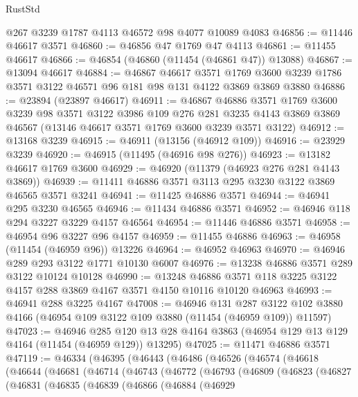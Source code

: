 \begin{lexlean}{RustStd}
\begin{coremodule}
    @267
    @3239
    @1787
    @4113
    @46572
    @98
    @4077
    @10089
    @4083
@46856 := @11446 @46617 @3571
@46860 := @46856 @47 @1769 @47 @4113
@46861 := @11455 @46617
@46866 := @46854 (@46860 (@11454 (@46861 @47)) @13088)
@46867 := @13094 @46617
@46884 := @46867
    @46617
    @3571
    @1769
    @3600
    @3239
    @1786
    @3571
    @3122
    @46571
    @96
    @181
    @98
    @131
    @4122
    @3869
    @3869
    @3880
@46886 := @23894 (@23897 @46617)
@46911 := @46867
    @46886
    @3571
    @1769
    @3600
    @3239
    @98
    @3571
    @3122
    @3986
    @109
    @276
    @281
    @3235
    @4143
    @3869
    @3869
    @46567
    (@13146 @46617 @3571 @1769 @3600 @3239 @3571 @3122)
@46912 := @13168 @3239
@46915 := @46911 (@13156 (@46912 @109))
@46916 := @23929 @3239
@46920 := @46915 (@11495 (@46916 @98 @276))
@46923 := @13182 @46617 @1769 @3600
@46929 := @46920 (@11379 (@46923 @276 @281 @4143 @3869))
@46939 := @11411 @46886 @3571 @3113 @295 @3230 @3122 @3869 @46565 @3571 @3241
@46941 := @11425 @46886 @3571
@46944 := @46941 @295 @3230 @46565
@46946 := @11434 @46886 @3571
@46952 := @46946 @118 @294 @3227 @3229 @4157 @46564
@46954 := @11446 @46886 @3571
@46958 := @46954 @96 @3227 @96 @4157
@46959 := @11455 @46886
@46963 := @46958 (@11454 (@46959 @96)) @13226
@46964 := @46952 @46963
@46970 := @46946 @289 @293 @3122 @1771 @10130 @6007
@46976 := @13238 @46886 @3571 @289 @3122 @10124 @10128
@46990 := @13248
    @46886
    @3571
    @118
    @3225
    @3122
    @4157
    @288
    @3869
    @4167
    @3571
    @4150
    @10116
    @10120
    @46963
@46993 := @46941 @288 @3225 @4167
@47008 := @46946
    @131
    @287
    @3122
    @102
    @3880
    @4166
    (@46954 @109 @3122 @109 @3880 (@11454 (@46959 @109)) @11597)
@47023 := @46946
    @285
    @120
    @13
    @28
    @4164
    @3863
    (@46954 @129 @13 @129 @4164 (@11454 (@46959 @129)) @13295)
@47025 := @11471 @46886 @3571
@47119 := @46334
    (@46395
      (@46443
        (@46486
          (@46526
            (@46574
              (@46618
                (@46644
                  (@46681
                    (@46714
                      (@46743
                        (@46772
                          (@46793
                            (@46809
                              (@46823
                                (@46827
                                  (@46831
                                    (@46835
                                      (@46839
                                        (@46866
                                          (@46884
                                            (@46929

\end{coremodule}
\end{lexlean}
